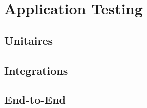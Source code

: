 \section{Application Testing}
\subsection{ Unitaires}
\subsection{ Integrations}
\subsection{ End-to-End}